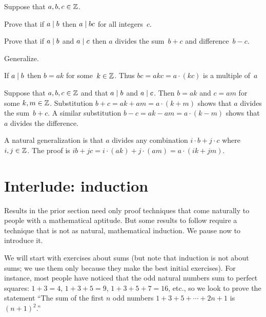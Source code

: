 \documentclass{ibl}  %
\begin{document}
\begin{ex}  \label{ex:DividesAndLinearCombinations}
Suppose that $a,b,c\in\mathbb{Z}$.
\begin{exes}
\item Prove that if $a\mid b$ then $a\mid bc$ for all integers~$c$.
\item Prove that if $a\mid b$ and $a\mid c$ then $a$ divides the 
  sum~$b+c$ and difference~$b-c$.
\item Generalize.
\end{exes}
\begin{ans}
\begin{exes}
\item If $a\mid b$ then $b=ak$ for some~$k\in\mathbb{Z}$.
  Thus $bc=akc=a\cdot(kc)$ is a multiple of~$a$
\item Suppose that $a,b,c\in\mathbb{Z}$ and that $a\mid b$ and $a\mid c$.
  Then $b=ak$ and $c=am$ for some $k,m\in\mathbb{Z}$. 
  Substitution  
  $b+c=ak+am=a\cdot(k+m)$
  shows that $a$ divides the sum~$b+c$.
  A similar substitution
  $b-c=ak-am=a\cdot(k-m)$
  shows that $a$ divides the difference.
\item A natural generalization is that $a$ divides any combination
  $i\cdot b+j\cdot c$ where $i,j\in\mathbb{Z}$.
  The proof is
  $ib+jc=i\cdot (ak)+j\cdot(am)=a\cdot(ik+jm)$.
\end{exes}
\end{ans}
\end{ex}




\section{Interlude: induction}
Results in the prior section need only proof techniques that come naturally
to people with a mathematical aptitude.
But some results to follow require a technique 
that is not as natural, mathematical induction.
We pause now to introduce it.

We will start with exercises about sums 
(but note that induction is not about sums;
we use them only because they make the best initial exercises).
For instance, most people have noticed that the odd natural numbers sum to 
perfect squares: $1+3=4$, $1+3+5=9$, $1+3+5+7=16$, etc.,
so we look to prove 
the statement 
``The sum of the first $n$ odd numbers $1+3+5+\cdots+2n+1$ is $(n+1)^2$.'' 
\end{document}
